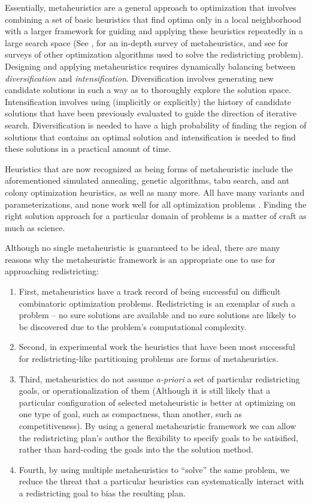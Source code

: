 \documentclass[article]{JSSstyle/jss}
\begin{document}
Essentially, metaheuristics are a general approach to optimization that involves 
combining a set of basic heuristics that find optima only in a local neighborhood with a 
larger framework for guiding and applying these heuristics 
repeatedly in a large search space (See \citep[][]{BlumRoli03}, for an in-depth 
survey of metaheuristics, and see 
\citep[][and the citations therein]{Altman97, CortonaEtAl99, 
Xiao03} for surveys of other optimization algorithms used to solve the redistricting problem).  
Designing and applying metaheuristics requires dynamically 
balancing between \emph{diversification}  and \emph{intensification}. Diversification involves generating new 
candidate solutions in such a way as to thoroughly explore the solution space. Intensification involves using (implicitly or explicitly) 
the history of candidate solutions that have been previously evaluated to guide the direction of iterative search. 
Diversification is needed to have a high probability of finding the region of solutions that contains an optimal solution 
and intensification is needed to find these solutions in a practical amount of time. 

Heuristics that are now recognized as being forms of metaheuristic include the aforementioned 
simulated annealing, genetic algorithms, tabu search, and ant colony optimization heuristics, as well as
many more.  All have many variants and parameterizations, and none work well for all optimization problems \citep[][]{WolMac97}.  
Finding the right solution approach for a particular domain of problems is a matter of craft as much as science.

Although no single metaheuristic is guaranteed to be ideal, there are many reasons 
why the metaheuristic framework is an appropriate one to use for approaching redistricting:
\begin{enumerate}
\item First, metaheuristics have a track record of being successful on difficult combinatoric optimization problems. Redistricting is an exemplar of such a problem -- no sure solutions are available and no sure solutions are likely to be discovered due to the problem's computational complexity.
\item Second, in experimental work the heuristics that have been most successful for redistricting-like partitioning problems are forms of metaheuristics.
\item Third, metaheuristics do not assume \emph{a-priori} a set of particular redistricting goals, or operationalization of them (Although 
it is still likely that a particular configuration of selected metaheuristic is better at optimizing on one
type of goal, such as compactness, than another, such as competitiveness). 
By using a general metaheuristic framework we can allow the redistricting plan's author 
the flexibility to specify goals to be satisified, rather than hard-coding the
goals into the the solution method.
\item Fourth, by using multiple metaheuristics to ``solve'' the same problem, 
we reduce the threat that a particular heuristics can 
systematically interact with a redistricting goal \citep[See][]{Altman98} to bias the resulting plan.
\end{enumerate}
\end{document}
